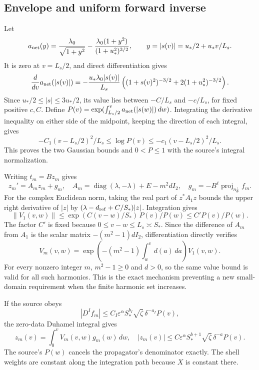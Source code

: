 \documentclass[10pt,a4paper]{article}
\begin{document}
\subsection{Envelope and uniform forward inverse}\label{si:envelope-and-uniform-forward-inverse}

Let \[
a_{\rm net}(y)=\frac{\lambda_0}{\sqrt{1+y^2}}-
\frac{\lambda_0(1+y^2)}{(1+u_*^2)^{3/2}},
\qquad y=|s(v)|=u_*/2+u_*v/L_s.
\] It is zero at \(v=L_s/2\), and direct differentiation gives \[
\frac{d}{dv}a_{\rm net}(|s(v)|)
=-\frac{u_*\lambda_0|s(v)|}{L_s}
\left((1+s(v)^2)^{-3/2}+2(1+u_*^2)^{-3/2}\right).
\] Since \(u_*/2\le|s|\le3u_*/2\), its value lies between \(-C/L_s\) and \(-c/L_s\), for fixed positive \(c,C\). Define \(P(v)=\exp(\int_{L_s/2}^v a_{\rm net}(|s(w)|)\,dw)\). Integrating the derivative inequality on either side of the midpoint, keeping the direction of each integral, gives \[
-C_1(v-L_s/2)^2/L_s\le\log P(v)\le-c_1(v-L_s/2)^2/L_s.
\] This proves the two Gaussian bounds and \(0<P\le1\) with the source's integral normalization.

Writing \(t_m=Bz_m\) gives \[
z_m'=A_mz_m+g_m,\quad
A_m=\operatorname{diag}(\lambda,-\lambda)+E-m^2dI_2,
\quad g_m=-B^\ell\operatorname{proj}_{n_\Phi^\perp}f_m.
\] For the complex Euclidean norm, taking the real part of \(z^*A_1z\) bounds the upper right derivative of \(|z|\) by \((\lambda-d_{\rm ref}+C/S_*)|z|\). Integration gives \[
\|V_1(v,w)\|\le
\exp(C(v-w)/S_*)\,P(v)/P(w)\le C'P(v)/P(w).
\] The factor \(C'\) is fixed because \(0\le v-w\le L_s\asymp S_*\). Since the difference of \(A_m\) from \(A_1\) is the scalar matrix \(-(m^2-1)dI_2\), differentiation directly verifies \[
V_m(v,w)=\exp\left(-(m^2-1)\int_w^v d(a)\,da\right)V_1(v,w).
\] For every nonzero integer \(m\), \(m^2-1\ge0\) and \(d>0\), so the same value bound is valid for all such harmonics. This is the exact mechanism preventing a new small-domain requirement when the finite harmonic set increases.

If the source obeys \[
|D^If_m|\le C_I\varepsilon^\alpha S_*^{b_I}
\sqrt\zeta\,\delta^{-a_I}P(v),
\] the zero-data Duhamel integral gives \[
z_m(v)=\int_0^vV_m(v,w)g_m(w)\,dw,\quad
|z_m(v)|\le C\varepsilon^\alpha S_*^{b+1}
\sqrt\zeta\,\delta^{-a}P(v).
\] The source's \(P(w)\) cancels the propagator's denominator exactly. The shell weights are constant along the integration path because \(X\) is constant there.
\end{document}
